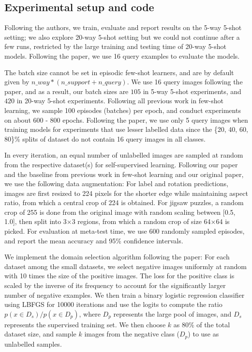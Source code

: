 \subsection{Experimental setup and code}

Following the authors, we train, evaluate and report results on the 5-way 5-shot setting; we also explore 20-way 5-shot setting but we could not continue after a few runs, restricted by the large training and testing time of 20-way 5-shot models. Following the paper, we use 16 query examples to evaluate the models.

The batch size cannot be set in episodic few-shot learners, and are by default given by $n\_way * (n\_support + n\_query)$. We use 16 query images following the paper, and as a result, our batch sizes are $105$ in 5-way 5-shot experiments, and $420$ in 20-way 5-shot experiments. Following all previous work in few-shot learning, we sample 100 episodes (batches) per epoch, and conduct experiments on about 600 - 800 epochs. Following the paper, we use only 5 query images when training models for experiments that use lesser labelled data since the \{20, 40, 60, 80\}\% splits of dataset do not contain 16 query images in all classes.

In every iteration, an equal number of unlabelled images are sampled at random from the respective dataset(s) for self-supervised learning. Following our paper and the baseline from previous work \cite{chen2018a} in few-shot learning and our original paper, we use the following data augmentation:  For label and rotation predictions, images are first resized to 224 pixels for the shorter edge while maintaining aspect ratio, from which a central crop of 224 is obtained. For jigsaw puzzles, a random crop of 255 is done from the original image with random scaling between [0.5, 1.0], then split into 3×3 regions, from which a random crop of size 64×64 is picked. For evaluation at meta-test time, we use 600 randomly sampled episodes, and report the mean accuracy and 95\% confidence intervals. 

We implement the domain selection algorithm following the paper: For each dataset among the small datasets, we select negative images uniformly at random with 10 times the size of the positive images. The loss for the positive class is scaled by the inverse of its frequency to account for the significantly larger number of negative examples. We then train a binary logistic regression classifier using LBFGS for 10000 iterations and use the logits to compute the ratio $p(x \in D_s) / p(x \in D_p)$, where $D_p$ represents the large pool of images, and $D_s$ represents the supervised training set. We then choose $k$ as 80\% of the total dataset size, and sample $k$ images from the negative class ($D_p$) to use as unlabelled samples.

